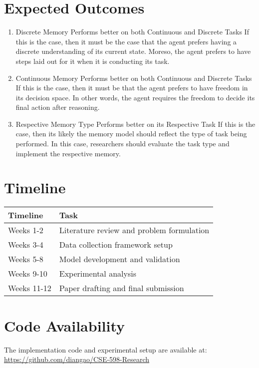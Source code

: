 \documentclass[11pt]{article}
\begin{document}
\section{Expected Outcomes}
\begin{enumerate}
    \item Discrete Memory Performs better on both Continuous and Discrete Tasks
    \subitem If this is the case, then it must be the case that the agent prefers having a discrete understanding of its current state. Moreso, the agent prefers to have steps laid out for it when it is conducting its task.
    \item Continuous Memory Performs better on both Continuous and Discrete Tasks
    \subitem If this is the case, then it must be that the agent prefers to have freedom in its decision space. In other words, the agent requires the freedom to decide its final action after reasoning.
    \item Respective Memory Type Performs better on its Respective Task
    \subitem If this is the case, then its likely the memory model should reflect the type of task being performed. In this case, researchers should evaluate the task type and implement the respective memory.
\end{enumerate}

\section{Timeline}
\begin{tabular}{@{}ll@{}}
\toprule
\textbf{Timeline} & \textbf{Task} \\ 
\midrule
Weeks 1-2 & Literature review and problem formulation \\
Weeks 3-4 & Data collection framework setup \\
Weeks 5-8 & Model development and validation \\
Weeks 9-10 & Experimental analysis \\
Weeks 11-12 & Paper drafting and final submission \\
\bottomrule
\end{tabular}

\section{Code Availability}
The implementation code and experimental setup are available at: \url{https://github.com/diangao/CSE-598-Research}
\end{document}
